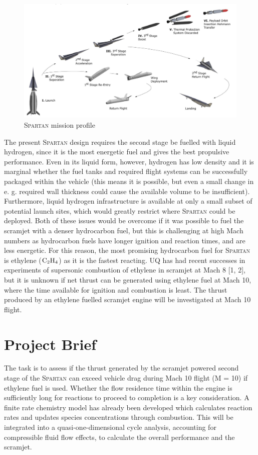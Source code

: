 \documentclass[a4paper]{article}
\begin{document}
\begin{figure}[H]
    \centering
    \includegraphics[width=0.9\linewidth]{part_2_img/spartan_overview.png}
    \caption{\textsc{Spartan} mission profile}
    \label{fig:mission_profile}
\end{figure}

The present \textsc{Spartan} design requires the second stage be fuelled with liquid hydrogen, since it is the most energetic fuel and gives the best propulsive performance. Even in its liquid form, however, hydrogen has low density and it is marginal whether the fuel tanks and required flight systems can be successfully packaged within the vehicle (this means it is possible, but even a small change in e. g. required wall thickness could cause the available volume to be insufficient). Furthermore, liquid hydrogen infrastructure is available at only a small subset of potential launch sites, which would greatly restrict where \textsc{Spartan} could be deployed. Both of these issues would be overcome if it was possible to fuel the scramjet with a denser hydrocarbon fuel, but this is challenging at high Mach numbers as hydrocarbon fuels have longer ignition and reaction times, and are less energetic. For this reason, the most promising hydrocarbon fuel for \textsc{Spartan} is ethylene (\(\ce{C2H4}\)) as it is the fastest reacting. UQ has had recent successes in experiments of supersonic combustion of ethylene in scramjet at Mach 8 [1, 2], but it is unknown if net thrust can be generated using ethylene fuel at Mach 10, where the time available for ignition and combustion is least. The thrust produced by an ethylene fuelled scramjet engine will be investigated at Mach 10 flight.

\section{Project Brief}
The task is to assess if the thrust generated by the scramjet powered second stage of the \textsc{Spartan} can exceed vehicle drag during Mach 10 flight (M = 10) if ethylene fuel is used. Whether the flow residence time within the engine is sufficiently long for reactions to proceed to completion is a key consideration. A finite rate chemistry model has already been developed which calculates reaction rates and updates species concentrations through combustion. This will be integrated into a quasi-one-dimensional cycle analysis, accounting for compressible fluid flow effects, to calculate the overall performance and the scramjet.
\end{document}
